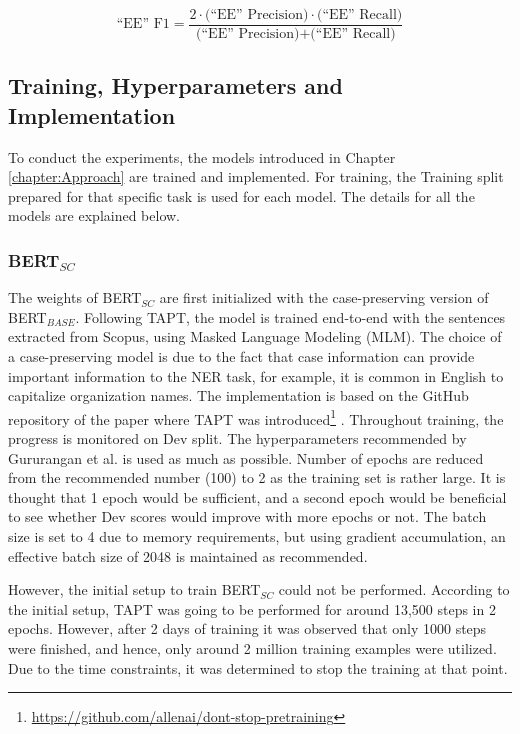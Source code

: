 \documentclass{report}
\theoremstyle{definition}
\theoremstyle{remark}
\begin{document}
\begin{fleqn}
\begin{equation}
    \text{``EE'' F1} = \frac{2 \cdot \text{(``EE'' Precision)} \cdot \text{(``EE'' Recall)}}{\text{(``EE'' Precision)} + \text{(``EE'' Recall)}}
\end{equation}
\end{fleqn}


\subsection{Training, Hyperparameters and Implementation}
\label{sec:EvalExpSetupTraining}
To conduct the experiments, the models introduced in Chapter \ref{chapter:Approach} are trained and implemented. For training, the Training split prepared for that specific task is used for each model. The details for all the models are explained below.
\subsubsection{BERT$_{SC}$}
The weights of BERT$_{SC}$ are first initialized with the case-preserving version of BERT$_{BASE}$. Following TAPT, the model is trained end-to-end with the sentences extracted from Scopus, using Masked Language Modeling (MLM). The choice of a case-preserving model is due to the fact that case information can provide important information to the NER task, for example, it is common in English to capitalize organization names. The implementation is based on the GitHub repository of the paper where TAPT was introduced\footnote{\url{https://github.com/allenai/dont-stop-pretraining}} \cite{DontStop}. Throughout training, the progress is monitored on Dev split. The hyperparameters recommended by Gururangan et al. \cite{DontStop} is used as much as possible. Number of epochs are reduced from the recommended number (100) to 2 as the training set is rather large. It is thought that 1 epoch would be sufficient, and a second epoch would be beneficial to see whether Dev scores would improve with more epochs or not. The batch size is set to 4 due to memory requirements, but using gradient accumulation, an effective batch size of 2048 is maintained as recommended. 

However, the initial setup to train BERT$_{SC}$ could not be performed. According to the initial setup, TAPT was going to be performed for around 13,500 steps in 2 epochs. However, after 2 days of training it was observed that only 1000 steps were finished, and hence, only around 2 million training examples were utilized. Due to the time constraints, it was determined to stop the training at that point. 
\end{document}
